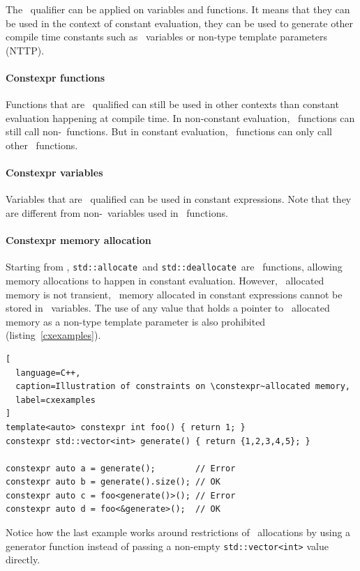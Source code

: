 \documentclass[../../main.tex]{subfiles}
\begin{document}
The \constexpr~qualifier can be applied on variables and functions. It means
that they can be used in the context of constant evaluation, \ie they can be
used to generate other compile time constants such as \constexpr~variables
or non-type template parameters (NTTP).

\paragraph{Constexpr functions} Functions that are \constexpr~qualified can
still be used in other contexts than constant evaluation happening at
compile time. In non-constant evaluation, \constexpr~functions can still call
non-\constexpr~functions. But in constant evaluation, \constexpr~functions can
only call other \constexpr~functions.


\paragraph{Constexpr variables} Variables that are \constexpr~qualified can be
used in constant expressions. Note that they are different from
non-\constexpr~variables used in \constexpr~functions.


\paragraph{Constexpr memory allocation} Starting from ,
\lstinline|std::allocate|~and \lstinline|std::deallocate|~are
\constexpr~functions, allowing memory allocations to happen in constant
evaluation. However,
\constexpr~allocated memory is not transient, \ie~memory allocated in
constant expressions cannot be stored in \constexpr~variables.
The use of any value that holds a pointer to \constexpr~allocated memory as a
non-type template parameter is also prohibited (listing~\ref{cxexamples}).

\begin{lstlisting}[
  language=C++,
  caption=Illustration of constraints on \constexpr~allocated memory,
  label=cxexamples
]
template<auto> constexpr int foo() { return 1; }
constexpr std::vector<int> generate() { return {1,2,3,4,5}; }

constexpr auto a = generate();        // Error
constexpr auto b = generate().size(); // OK
constexpr auto c = foo<generate()>(); // Error
constexpr auto d = foo<&generate>();  // OK
\end{lstlisting}

Notice how the last example works around restrictions of \constexpr~allocations
by using a generator function instead of passing a non-empty
\lstinline|std::vector<int>| value directly.
\end{document}
